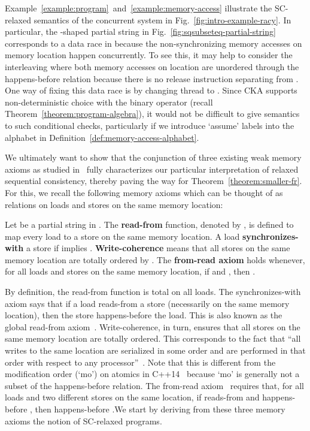 \documentclass{llncs}
\newcommand{\defn}[1]{\textbf{#1}}
\begin{document}
\begin{example}
\label{example:memory-access-with-data-race}
Example~\ref{example:program}~and~\ref{example:memory-access} illustrate the SC-relaxed semantics of the concurrent system in Fig.~\ref{fig:intro-example-racy}. In particular, the -shaped partial string in Fig.~\ref{fig:sqsubseteq-partial-string} corresponds to a data race in  because the non-synchronizing memory accesses on memory location  happen concurrently. To see this, it may help to consider the interleaving  where both memory accesses on location  are unordered through the happens-before relation because there is no release instruction separating  from . One way of fixing this data race is by changing thread  to . Since CKA supports non-deterministic choice with the  binary operator (recall Theorem~\ref{theorem:program-algebra}), it would not be difficult to give semantics to such conditional checks, particularly if we introduce `assume' labels into the alphabet in Definition~\ref{def:memory-access-alphabet}.
\end{example}

We ultimately want to show that the conjunction of three existing weak memory axioms as studied in~\cite{AMSS2012} fully characterizes our particular interpretation of relaxed sequential consistency, thereby paving the way for Theorem~\ref{theorem:smaller-fr}. For this, we recall the following memory axioms which can be thought of as relations on loads and stores on the same memory location:

\begin{definition}
\label{def:memory-axioms}
Let  be a partial string in . The \defn{read-from} function, denoted by , is defined to map every load to a store on the same memory location. A load  \defn{synchronizes-with} a store  if  implies . \defn{Write-coherence} means that all stores  on the same memory location are totally ordered by . The \defn{from-read axiom} holds whenever, for all loads  and stores  on the same memory location, if  and , then .
\end{definition}

By definition, the read-from function is total on all loads. The synchronizes-with axiom says that if a load reads-from a store (necessarily on the same memory location), then the store happens-before the load. This is also known as the global read-from axiom~\cite{AMSS2012}. Write-coherence, in turn, ensures that all stores on the same memory location are totally ordered. This corresponds to the fact that ``all writes to the same location are serialized in some order and are performed in that order with respect to any processor''~\cite{GLLGGH1990}. Note that this is different from the modification order (`mo') on atomics in C++14~\cite{CPP14} because `mo' is generally not a subset of the happens-before relation. The from-read axiom~\cite{AMSS2012} requires that, for all loads  and two different stores  on the same location, if  reads-from  and  happens-before , then  happens-before .We start by deriving from these three memory axioms the notion of SC-relaxed programs.
\end{document}
